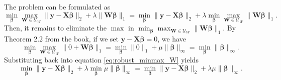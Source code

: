 \documentclass{article}%
\begin{document}
\begin{solution}
The problem can be formulated as 
\begin{equation}
    \min_{\boldsymbol{\beta}} \max_{\mathbf{W} \in \mathcal{U}_W} \| \mathbf{y} - \mathbf{X} \boldsymbol{\beta} \|_2 + \lambda \|\mathbf{W}\boldsymbol{\beta}\|_1 =\min_{\boldsymbol{\beta}} \| \mathbf{y} - \mathbf{X} \boldsymbol{\beta} \|_2 +  \lambda \min_{\boldsymbol{\beta}} \max_{\mathbf{W} \in \mathcal{U}_W}\|\mathbf{W}\boldsymbol{\beta}\|_1. \label{eq:robust_minmax_W}
\end{equation}
Then, it remains to eliminate the $\max$ in $ \min_{\boldsymbol{\beta}} \max_{\mathbf{W} \in \mathcal{U}_W} \|\mathbf{W}\boldsymbol{\beta}\|_1$.
By Theorem 2.2 from the book, if we set $\mathbf{y}- \mathbf{X}\boldsymbol{\beta} = 0$, we have 
\begin{equation}
    \min_{\boldsymbol{\beta}} \max_{\mathbf{W} \in \mathcal{U}_W} \|0 + \mathbf{W}\boldsymbol{\beta}\|_1 = \min_{\boldsymbol{\beta}} \|0\|_1 + \mu \|\boldsymbol{\beta} \|_\infty = \min_{\boldsymbol{\beta}} \|\boldsymbol{\beta} \|_\infty .
\end{equation}
Substituting back into equation \eqref{eq:robust_minmax_W} yields 
\begin{equation}
    \min_{\boldsymbol{\beta}} \| \mathbf{y} - \mathbf{X} \boldsymbol{\beta} \|_2 +  \lambda \min_{\boldsymbol{\beta}}  \mu \|\boldsymbol{\beta}\|_\infty = \min_{\boldsymbol{\beta}}\| \mathbf{y} - \mathbf{X} \boldsymbol{\beta} \|_2 + \lambda \mu \|\boldsymbol{\beta}\|_\infty. 
\end{equation}
\end{solution}
\end{document}
